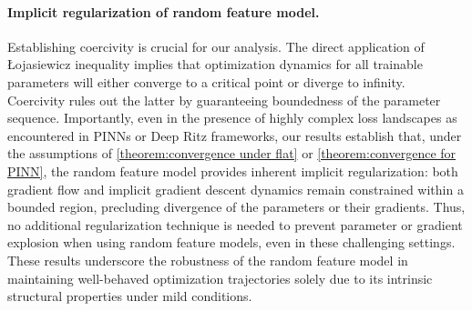 \documentclass{article}
\begin{document}
\paragraph{Implicit regularization of random feature model.}
Establishing coercivity is crucial for our analysis. 
The direct application of \L{}ojasiewicz inequality implies that optimization dynamics for all trainable parameters will either converge to a critical point or diverge to infinity. 
Coercivity rules out the latter by guaranteeing boundedness of the parameter sequence. 
Importantly, even in the presence of highly complex loss landscapes as encountered in PINNs or Deep Ritz frameworks, our results establish that, under the assumptions of \cref{theorem:convergence under flat} or \cref{theorem:convergence for PINN}, the random feature model provides inherent implicit regularization: both gradient flow and implicit gradient descent dynamics remain constrained within a bounded region, precluding divergence of the parameters or their gradients. 
Thus, no additional regularization technique is needed to prevent parameter or gradient explosion when using random feature models, even in these challenging settings.
These results underscore the robustness of the random feature model in maintaining well-behaved optimization trajectories solely due to its intrinsic structural properties under mild conditions.
\end{document}
